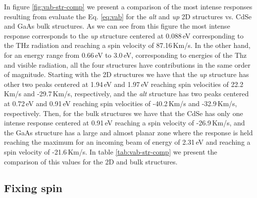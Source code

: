 \documentclass[prb,11pt,tightenlines,twocolumn,aps]{revtex4-1}
\begin{document}
In figure \ref{fig:vab-str-comp} we present a comparison of the most intense
responses resulting from evaluate the Eq. \eqref{eq:vab} for the \emph{alt} and
\emph{up} 2D structures vs. CdSe and GaAs bulk structures. As we can see from
this figure the most intense response corresponds to the \emph{up} structure
centered at 0.088\,eV corresponding to the THz radiation and reaching a
spin velocity of 87.16\,Km/s.
% 
In the other hand, for an energy range from 0.66\,eV to 3.0\,eV, corresponding
to energies of the Thz and visible radiation, all the four structures have
contributions in the same order of magnitude.
% 
Starting with the 2D structures we have that the \emph{up} structure has other
two peaks centered at 1.94\,eV and 1.97\,eV reaching spin velocities of
22.2\,Km/s and -29.7\,Km/s, respectively, and the \emph{alt} structure has two
peaks centered at 0.72\,eV and 0.91\,eV reaching spin velocities of -40.2\,Km/s
and -32.9\,Km/s, respectively.
% 
Then, for the bulk structures we have that the CdSe has only one intense
response centered at 0.91\,eV reaching a spin velocity of -26.9\,Km/s, and the
GaAs structure has a large and almost planar zone where the response is held
reaching the maximum for an incoming beam of energy of 2.31\,eV and reaching a
spin velocity of -21.6\,Km/s.
% 
In table \ref{tab:vab-str-comp} we present the comparison of this values for the
2D and bulk structures.
% 




\subsection{Fixing spin} %
\label{sec:res-fixspin}


\end{document}
